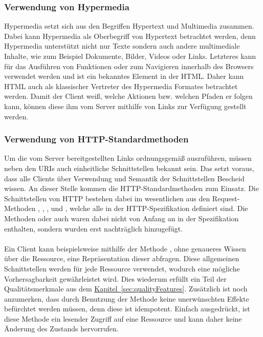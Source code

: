 \subsubsection{Verwendung von Hypermedia}
Hypermedia setzt sich aus den Begriffen Hypertext und Multimedia zusammen. Dabei kann Hypermedia als Oberbegriff von Hypertext betrachtet werden, denn Hypermedia unterstützt nicht nur Texte sondern auch andere multimediale Inhalte, wie zum Beispiel Dokumente, Bilder, Videos oder Links. Letzteres kann für das Ausführen von Funktionen oder zum Navigieren innerhalb des Browsers verwendet werden und ist ein bekanntes Element in der \gls{HTML}. Daher kann \gls{HTML} auch als klassischer Vertreter des Hypermedia Formates betrachtet werden. Damit der Client weiß, welche Aktionen bzw. welchen Pfaden er folgen kann, können diese ihm vom Server mithilfe von Links zur Verfügung gestellt werden.

\subsubsection{Verwendung von HTTP-Standardmethoden}
Um die vom Server bereitgestellten Links ordnungsgemäß auszuführen, müssen neben den \glspl{URI} auch einheitliche Schnittstellen bekannt sein. Das setzt voraus, dass alle Clients über Verwendung und Semantik der Schnittstellen Bescheid wissen. An dieser Stelle kommen die \gls{HTTP}-Standardmethoden zum Einsatz. Die Schnittstellen von \gls{HTTP} bestehen dabei im wesentlichen aus den Request-Methoden , , ,  und , welche alle in der \gls{HTTP}-Spezifikation \cite{httpSpecification} definiert sind. Die Methoden  oder auch  waren dabei nicht von Anfang an in der Spezifikation enthalten, sondern wurden erst nachträglich hinzugefügt.\\
\\
Ein Client kann beispielsweise mithilfe der Methode , ohne genaueres Wissen über die Ressource, eine Repräsentation dieser abfragen. Diese allgemeinen Schnittstellen werden für jede Ressource verwendet, wodurch eine mögliche Vorhersagbarkeit gewährleistet wird. Dies wiederum erfüllt ein Teil der Qualitätsmerkmale aus dem \hyperref[sec:qualityFeatures]{Kapitel~\ref{sec:qualityFeatures}}. Zusätzlich ist noch anzumerken, dass durch Benutzung der Methode  keine unerwünschten Effekte befürchtet werden müssen, denn diese ist idempotent. Einfach ausgedrückt, ist diese Methode ein lesender Zugriff auf eine Ressource und kann daher keine Änderung des Zustands hervorrufen.

